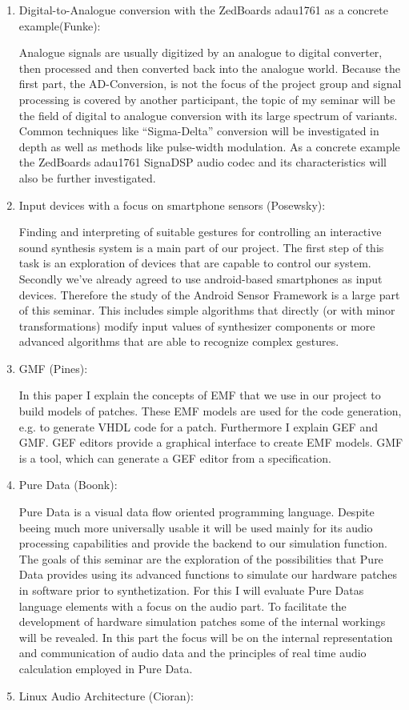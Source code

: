 \begin{enumerate}
	\item Digital-to-Analogue conversion with the ZedBoards adau1761 as a concrete example(Funke):
	
	Analogue signals are usually digitized by an analogue to digital converter, then processed and then converted back into the analogue world. Because the first part, the AD-Conversion, is not the focus of the project group and signal processing is covered by another participant, the topic of my seminar will be the field of digital to analogue conversion with its large spectrum of variants. Common techniques like ``Sigma-Delta'' conversion will be investigated in depth as well as methods like pulse-width modulation. As a concrete example the ZedBoards adau1761 SignaDSP audio codec and its characteristics will also be further investigated.
	\item Input devices with a focus on smartphone sensors (Posewsky):
	
	Finding and interpreting of suitable gestures for controlling an interactive sound synthesis system is a main part of our project. The first step of this task is an exploration of devices that are capable to control our system. Secondly we've already agreed to use android-based smartphones as input devices. Therefore the study of the Android Sensor Framework is a large part of this seminar. This includes simple algorithms that directly (or with minor transformations) modify input values of synthesizer components or more advanced algorithms that are able to recognize complex gestures.
	\item GMF (Pines):
	
	In this paper I explain the concepts of \ac{EMF} that we use in our project to build models of patches. These \ac{EMF} models are used for the code generation, e.g. to generate \ac{VHDL} code for a patch. Furthermore I explain \ac{GEF} and \ac{GMF}. \ac{GEF} editors provide a graphical interface to create \ac{EMF} models. \ac{GMF} is a tool, which can generate a \ac{GEF} editor from a specification.
	\item Pure Data (Boonk):
	
	Pure Data is a visual data flow oriented programming language. Despite beeing much more universally usable it will be used mainly for its audio processing capabilities and provide the backend to our simulation function. The goals of this seminar are the exploration of the possibilities that Pure Data provides using its advanced functions to simulate our hardware patches in software prior to synthetization. For this I will evaluate Pure Datas language elements with a focus on the audio part. To facilitate the development of hardware simulation patches some of the internal workings will be revealed. In this part the focus will be on the internal representation and communication of audio data and the principles of real time audio calculation employed in Pure Data.
	\item Linux Audio Architecture (Cioran):
	

\end{enumerate}
